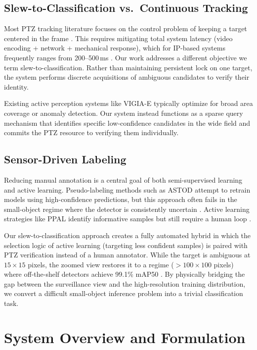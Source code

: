 \documentclass[conf]{new-aiaa}
\begin{document}
\subsection{Slew-to-Classification vs.\ Continuous Tracking}
Most PTZ tracking literature focuses on the control problem of keeping a target centered in the frame \cite{Chen2015, Tang2017}. This requires mitigating total system latency (video encoding + network + mechanical response), which for IP-based systems frequently ranges from 200--500\,ms \cite{PTZOptics2024}. Our work addresses a different objective we term slew-to-classification. Rather than maintaining persistent lock on one target, the system performs discrete acquisitions of ambiguous candidates to verify their identity.

Existing active perception systems like VIGIA-E \cite{Pedrosa2025} typically optimize for broad area coverage or anomaly detection. Our system instead functions as a sparse query mechanism that identifies specific low-confidence candidates in the wide field and commits the PTZ resource to verifying them individually.

\subsection{Sensor-Driven Labeling}
Reducing manual annotation is a central goal of both semi-supervised learning and active learning. Pseudo-labeling methods such as ASTOD \cite{Vandeghen2023} attempt to retrain models using high-confidence predictions, but this approach often fails in the small-object regime where the detector is consistently uncertain \cite{Sajid2024}. Active learning strategies like PPAL \cite{Yang2024AL} identify informative samples but still require a human loop \cite{MoralesHernandez2023}.

Our slew-to-classification approach creates a fully automated hybrid in which the selection logic of active learning (targeting less confident samples) is paired with PTZ verification instead of a human annotator. While the target is ambiguous at $15 \times 15$ pixels, the zoomed view restores it to a regime ($>100 \times 100$ pixels) where off-the-shelf detectors achieve 99.1\% mAP50 \cite{Reis2023}. By physically bridging the gap between the surveillance view and the high-resolution training distribution, we convert a difficult small-object inference problem into a trivial classification task.

\section{System Overview and Formulation}
\end{document}
